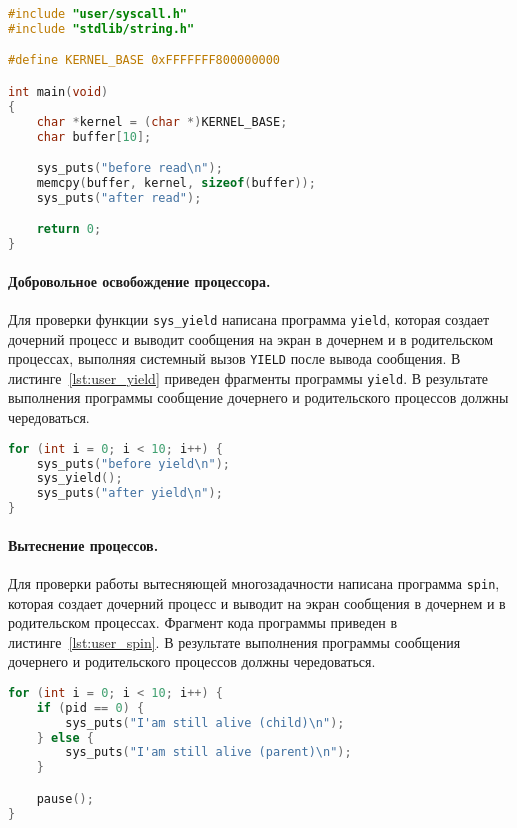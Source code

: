 \begin{lstlisting}[language=C, caption={Чтение из области ядра}, label={lst:read_kernel}]
#include "user/syscall.h"
#include "stdlib/string.h"

#define KERNEL_BASE 0xFFFFFFF800000000

int main(void)
{
	char *kernel = (char *)KERNEL_BASE;
	char buffer[10];

	sys_puts("before read\n");
	memcpy(buffer, kernel, sizeof(buffer));
	sys_puts("after read");

	return 0;
}
\end{lstlisting}

\paragraph{Добровольное освобождение процессора.} Для проверки функции \texttt{sys\_yield}
написана программа \texttt{yield}, которая создает дочерний процесс и выводит сообщения
на экран в дочернем и в родительском процессах, выполняя системный вызов \texttt{YIELD}
после вывода сообщения. В листинге~\ref{lst:user_yield} приведен фрагменты программы
\texttt{yield}. В результате выполнения программы сообщение дочернего и родительского процессов
должны чередоваться.

\begin{lstlisting}[language=C, caption={Использование функции \texttt{sys\_yield}}, label={lst:user_yield}]
for (int i = 0; i < 10; i++) {
	sys_puts("before yield\n");
	sys_yield();
	sys_puts("after yield\n");
}
\end{lstlisting}


\paragraph{Вытеснение процессов.} Для проверки работы вытесняющей многозадачности написана
программа \texttt{spin}, которая создает дочерний процесс и выводит на экран сообщения в
дочернем и в родительском процессах. Фрагмент кода программы приведен в листинге~\ref{lst:user_spin}.
В результате выполнения программы сообщения дочернего и родительского процессов должны чередоваться.

\begin{lstlisting}[language=C, caption={Фрагмент кода программы \texttt{spin}}, label={lst:user_spin}]
for (int i = 0; i < 10; i++) {
	if (pid == 0) {
		sys_puts("I'am still alive (child)\n");
	} else {
		sys_puts("I'am still alive (parent)\n");
	}

	pause();
}
\end{lstlisting}

